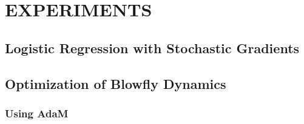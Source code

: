 \documentclass[]{article}
\begin{document}
\section{EXPERIMENTS} \label{experiments}

\subsection{Logistic Regression with Stochastic Gradients}

\subsection{Optimization of Blowfly Dynamics}

\subsubsection{Using AdaM}
\end{document}
